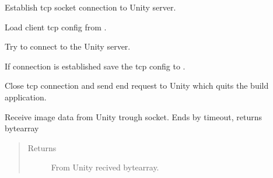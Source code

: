 \documentclass[letterpaper,10pt,english]{sphinxmanual}
\begin{document}
\begin{fulllineitems}
\begin{fulllineitems}
\begin{quote}
\begin{description}
\end{description}\end{quote}

\end{fulllineitems}


\begin{fulllineitems}
\label{\detokenize{index:client.client_communicator_to_unity.connect_to_server}}
Establish tcp socket connection to Unity server.

Load client tcp config from .

Try to connect to the Unity server.

If connection is established save the tcp config to .

\end{fulllineitems}


\begin{fulllineitems}
\label{\detokenize{index:client.client_communicator_to_unity.exit}}
Close tcp connection and send end request to Unity which quits the build application.

\end{fulllineitems}


\begin{fulllineitems}
\label{\detokenize{index:client.client_communicator_to_unity.receive_data_as_bytes}}
Receive image data from Unity trough socket. Ends by timeout, returns bytearray
\begin{quote}\begin{description}
\item[{Returns}] \leavevmode
From Unity recived bytearray.


\end{description}
\end{quote}
\end{fulllineitems}
\end{fulllineitems}
\end{document}
